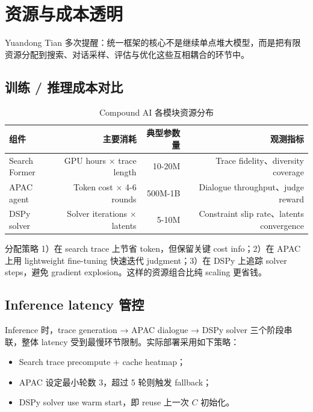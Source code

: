 \section{资源与成本透明}

Yuandong Tian 多次提醒：统一框架的核心不是继续单点堆大模型，而是把有限资源分配到搜索、对话采样、评估与优化这些互相耦合的环节中。

\subsection{训练 / 推理成本对比}

\begin{table}[H]
\centering
\begin{tabular}{lrrr}
\toprule
组件 & 主要消耗 & 典型参数量 & 观测指标 \\
\midrule
Search Former & GPU hours × trace length & 10-20M & Trace fidelity、diversity coverage \\
APAC agent & Token cost × 4-6 rounds & 500M-1B & Dialogue throughput、judge reward \\
DSPy solver & Solver iterations × latents & 5-10M & Constraint slip rate、latents convergence \\
\bottomrule
\end{tabular}
\caption{Compound AI 各模块资源分布}
\end{table}

\begin{importantbox}{分配策略}
1）在 search trace 上节省 token，但保留关键 cost info；2）在 APAC 上用 lightweight fine-tuning 快速迭代 judgment；3）在 DSPy 上追踪 solver steps，避免 gradient explosion。这样的资源组合比纯 scaling 更省钱。
\end{importantbox}

\subsection{Inference latency 管控}

Inference 时，trace generation → APAC dialogue → DSPy solver 三个阶段串联，整体 latency 受到最慢环节限制。实际部署采用如下策略：
\begin{itemize}
    \item Search trace precompute + cache heatmap；
    \item APAC 设定最小轮数 3，超过 5 轮则触发 fallback；
    \item DSPy solver use warm start，即 reuse 上一次 \(C\) 初始化。
\end{itemize}

